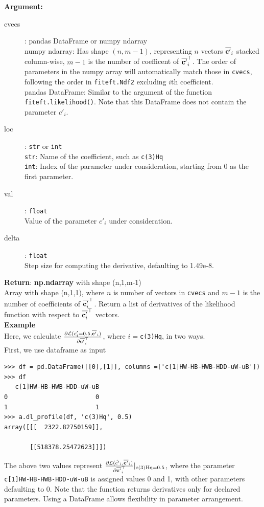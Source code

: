 \documentclass[12pt]{article}
\def\b#1{\boldsymbol{\rm #1}}
\begin{document}
\textbf{Argument:}
\begin{description}
  \item[cvecs]: pandas DataFrame or numpy ndarray\\
  numpy ndarray: Has shape $(n, m-1)$, representing $n$ vectors $\overline{\b c'}_i$ stacked column-wise, $m-1$ is the number of coefficent of $\overline{\b c'}_i^\top$. The order of parameters in the numpy array will automatically match those in \verb|cvecs|, following the order in \verb|fiteft.Ndf2| excluding $i$th coefficient.\\
  pandas DataFrame: Similar to the argument of the function \verb|fiteft.likelihood()|. Note that this DataFrame does not contain the parameter $c'_i$.
  \item[loc]: \verb|str| or \verb|int| \\
  \verb|str|: Name of the coefficient, such as \verb|c(3)Hq|\\
  \verb|int|: Index of the parameter under consideration, starting from 0 as the first parameter.
  \item[val]: \verb|float| \\
  Value of the parameter $c'_i$ under consideration.
  \item[delta]: \verb|float| \\
  Step size for computing the derivative, defaulting to 1.49e-8.
\end{description}
\textbf{Return}: \textbf{np.ndarray} with shape (n,1,m-1)\\
\indent Array with shape (n,1,1), where $n$ is number of vectors in \verb|cvecs| and $m-1$ is the number of coefficients of $\overline{\b c'_i}^\top$. Return a list of derivatives of the likelihood function with respect to $\overline{\b c'_i}^\top$ vectors.
 \\[1cm]
 \textbf{Example}\\
 Here, we calculate $\frac{\partial \mathcal{L}(c'_i=0.5,\overline{\b c'}_i)}{\partial \overline{\b c'}_i^\top} $, where $i=$\verb|c(3)Hq|, in two ways.\\
 First, we use dataframe as input
\begin{verbatim}
>>> df = pd.DataFrame([[0],[1]], columns =['c[1]HW-HB-HWB-HDD-uW-uB'])
>>> df
   c[1]HW-HB-HWB-HDD-uW-uB
0                        0
1                        1
>>> a.dl_profile(df, 'c(3)Hq', 0.5)
array([[[  2322.82750159]],

       [[518378.25472623]]])
\end{verbatim}
The above two values represent $\frac{\partial \mathcal{L}(\hat{c'}_i,\overline{\b c'}_i)}{\partial \overline{\b c'}_i^\top}|_{\text{c(3)Hq}=0.5}$, where the parameter \verb|c[1]HW-HB-HWB-HDD-uW-uB| is assigned values 0 and 1, with other parameters defaulting to 0. Note that the function returns derivatives only for declared parameters. Using a DataFrame allows flexibility in parameter arrangement.
\end{document}
